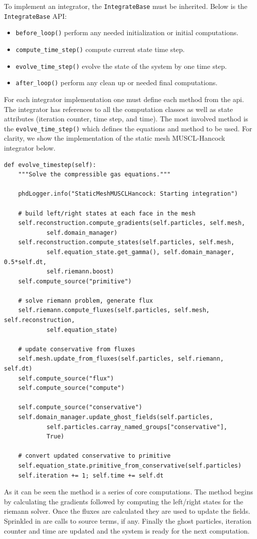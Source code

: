 To implement an integrator, the \lstinline{IntegrateBase} must be inherited. Below
is the \lstinline{IntegrateBase} API:
\begin{itemize}
    \item \lstinline{before_loop()} perform any needed initialization or initial computations. 
    \item \lstinline{compute_time_step()} compute current state time step.
    \item \lstinline{evolve_time_step()} evolve the state of the system by one time step.
    \item \lstinline{after_loop()} perform any clean up or needed final computations.
\end{itemize}
For each integrator implementation one must define each method from the api. The integrator
has references to all the computation classes as well as state attributes (iteration
counter, time step, and time). The most
involved method is the \lstinline{evolve_time_step()} which defines the equations
and method to be used. For clarity, we show the implementation of the static mesh
MUSCL-Hancock integrator below.
\begin{lstlisting}
def evolve_timestep(self):
    """Solve the compressible gas equations."""

    phdLogger.info("StaticMeshMUSCLHancock: Starting integration")

    # build left/right states at each face in the mesh
    self.reconstruction.compute_gradients(self.particles, self.mesh,
            self.domain_manager)
    self.reconstruction.compute_states(self.particles, self.mesh,
            self.equation_state.get_gamma(), self.domain_manager, 0.5*self.dt,
            self.riemann.boost)
    self.compute_source("primitive")

    # solve riemann problem, generate flux
    self.riemann.compute_fluxes(self.particles, self.mesh, self.reconstruction,
            self.equation_state)

    # update conservative from fluxes
    self.mesh.update_from_fluxes(self.particles, self.riemann, self.dt)
    self.compute_source("flux")
    self.compute_source("compute")

    self.compute_source("conservative")
    self.domain_manager.update_ghost_fields(self.particles,
            self.particles.carray_named_groups["conservative"],
            True)

    # convert updated conservative to primitive
    self.equation_state.primitive_from_conservative(self.particles)
    self.iteration += 1; self.time += self.dt
\end{lstlisting}
As it can be seen the method is a series of core computations. The method
begins by calculating the gradients followed by computing the left/right
states for the riemann solver. Once the fluxes are calculated they are used
to update the fields. Sprinkled in are calls to source terms, if any.
Finally the ghost particles, iteration counter and
time are updated and the system is ready for the next computation.


